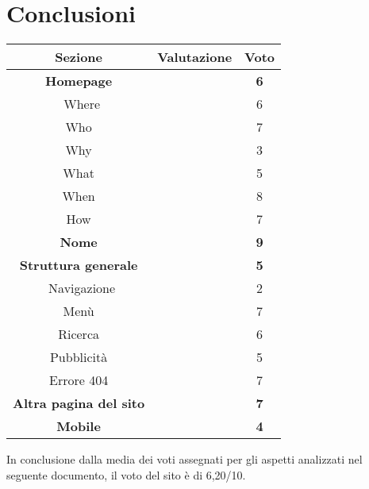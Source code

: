 \section{Conclusioni}
\begin{center}
	\begin{tabularx}{\textwidth}{|c|X|c|}
		\hline
		\textbf{Sezione} & \textbf{Valutazione} &\textbf{Voto} \\ \hline
		
		\textbf{Homepage} &	&	\textbf{6}\\
		\hdashline 
		\multirow{5}{0cm}\
		Where 	& \textit{} &	6\\
		Who		& \textit{} &	7\\
		Why 	& \textit{} &	3\\
		What 	& \textit{} &	5\\
		When 	& \textit{} &	8\\
		How 	& \textit{} &	7\\
		\hline
		
		\textbf{Nome} & \textit{\textbf{}} & \textbf{9} \\ \hline
		
		\textbf{Struttura generale} &	&	\textbf{5}\\
		\hdashline 
		\multirow{5}{0cm}\
		Navigazione & \textit{} &	2\\
		Menù		& \textit{} &	7\\
		Ricerca 	& \textit{} &	6\\
		Pubblicità 	& \textit{} &	5\\
		Errore 404	& \textit{}	&	7\\
		\hline
		 
		\textbf{Altra pagina del sito} 	& \textit{\textbf{}} & \textbf{7} \\ \hline
		\textbf{Mobile} 				& \textit{\textbf{}} & \textbf{4} \\ \hline
		
	\end{tabularx}

\end{center}

In conclusione dalla media dei voti assegnati per gli aspetti analizzati nel seguente documento, il voto del sito è di 6,20/10.